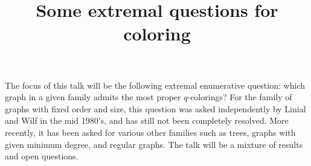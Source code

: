 \title{Some extremal questions for coloring}
\endtitle
The focus of this talk will be the following extremal enumerative question: which graph in a given family admits the most proper $q$-colorings? For the family of graphs with fixed order and size, this question was asked independently by Linial and Wilf in the mid 1980's, and has still not been completely resolved. More recently, it has been asked for various other families such as trees, graphs with given minimum degree, and regular graphs. The talk will be a mixture of results and open questions.  

